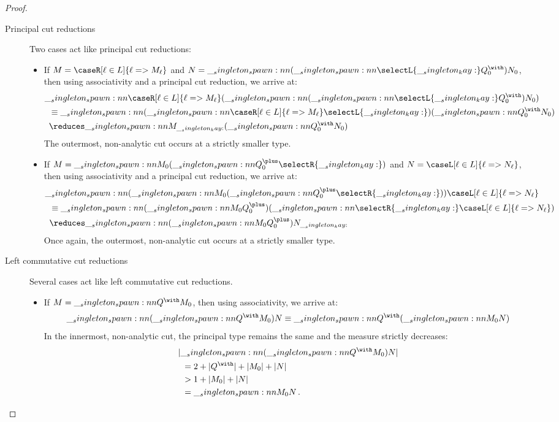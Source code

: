 \begin{proof}
\begin{description}
  \item[Principal cut reductions]
    Two cases act like principal cut reductions:
    \begin{itemize}
    \item If $M = \caseR[\ell \in L]{\ell => M_{\ell}}$ and $N = \spawn{(\spawn{\selectL{\kay}}{Q^{\with}_0})}{N_0}$, then using associativity and a principal cut reduction, we arrive at:
      \begin{align*}
        \MoveEqLeft[0.5]
        \spawn{\caseR[\ell \in L]{\ell => M_{\ell}}}{(\spawn{(\spawn{\selectL{\kay}}{Q^{\with}_0})}{N_0})} \\
          &\equiv \spawn{(\spawn{\caseR[\ell \in L]{\ell => M_{\ell}}}{\selectL{\kay}})}{(\spawn{Q^{\with}_0}{N_0})} \\
          &\reduces \spawn{M_{\kay}}{(\spawn{Q^{\with}_0}{N_0})}
      \end{align*}
      The outermost, non-analytic cut occurs at a strictly smaller type.

    \item If $M = \spawn{M_0}{(\spawn{Q^{\plus}_0}{\selectR{\kay}})}$ and $N = \caseL[\ell \in L]{\ell => N_{\ell}}$, then using associativity and a principal cut reduction, we arrive at:
      \begin{align*}
        \MoveEqLeft[0.5]
        \spawn{(\spawn{M_0}{(\spawn{Q^{\plus}_0}{\selectR{\kay}})})}{\caseL[\ell \in L]{\ell => N_{\ell}}} \\
          &\equiv \spawn{(\spawn{M_0}{Q^{\plus}_0})}{(\spawn{\selectR{\kay}}{\caseL[\ell \in L]{\ell => N_{\ell}}})} \\
          &\reduces \spawn{(\spawn{M_0}{Q^{\plus}_0})}{N_{\kay}}      
      \end{align*}
      Once again, the outermost, non-analytic cut occurs at a strictly smaller type.
    \end{itemize}

  \item[Left commutative cut reductions]
    Several cases act like left commutative cut reductions.
    \begin{itemize}
    \item If $M = \spawn{Q^{\with}}{M_0}$, then using associativity, we arrive at:
      \begin{equation*}
        \spawn{(\spawn{Q^{\with}}{M_0})}{N}
          \equiv \spawn{Q^{\with}}{(\spawn{M_0}{N})}      
      \end{equation*}
      In the innermost, non-analytic cut, the principal type remains the same and the measure strictly decreases:
      \begin{align*}
        \MoveEqLeft[0.5]
        \meas{\spawn{(\spawn{Q^{\with}}{M_0})}{N}} \\
          &= 2 + \qmeas{Q^{\with}} + \meas{M_0} + \meas{N} \\
          &> 1 + \meas{M_0} + \meas{N} \\
          &= \spawn{M_0}{N}
        \,.
      \end{align*}


\end{itemize}
\end{description}
\end{proof}
